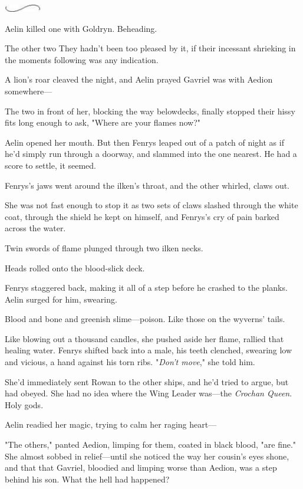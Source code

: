 \includegraphics[width=0.65in,height=0.13in]{images/seperator}

Aelin killed one with Goldryn. Beheading.

The other two  They hadn't been too pleased by it, if their incessant shrieking in the moments following was any indication.

A lion's roar cleaved the night, and Aelin prayed Gavriel was with Aedion somewhere---

The two in front of her, blocking the way belowdecks, finally stopped their hissy fits long enough to ask, "Where are your flames now?"

Aelin opened her mouth. But then Fenrys leaped out of a patch of night as if he'd simply run through a doorway, and slammed into the one nearest. He had a score to settle, it seemed.

Fenrys's jaws went around the ilken's throat, and the other whirled, claws out.

She was not fast enough to stop it as two sets of claws slashed through the white coat, through the shield he kept on himself, and Fenrys's cry of pain barked across the water.

Twin swords of flame plunged through two ilken necks.

Heads rolled onto the blood-slick deck.

Fenrys staggered back, making it all of a step before he crashed to the planks. Aelin surged for him, swearing.

Blood and bone and greenish slime---poison. Like those on the wyverns' tails.

Like blowing out a thousand candles, she pushed aside her flame, rallied that healing water. Fenrys shifted back into a male, his teeth clenched, swearing low and vicious, a hand against his torn ribs. "\emph{Don't move}," she told him.

She'd immediately sent Rowan to the other ships, and he'd tried to argue, but  had obeyed. She had no idea where the Wing Leader was---the \emph{Crochan Queen}. Holy gods.

Aelin readied her magic, trying to calm her raging heart---

"The others," panted Aedion, limping for them, coated in black blood, "are fine." She almost sobbed in relief---until she noticed the way her cousin's eyes shone, and that  that Gavriel, bloodied and limping worse than Aedion, was a step behind his son. What the hell had happened?


